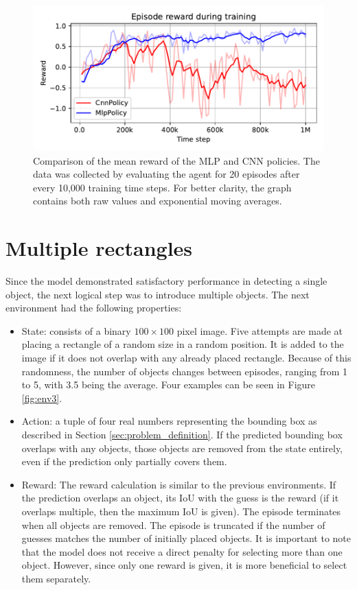 \documentclass[
  digital,     %
  oneside,     %
  nosansbold,  %
  nocolorbold, %
  lof,         %
  lot,         %
]{fithesis4}
\begin{document}
\begin{figure}
    \includegraphics[width=1\linewidth]{graphs/v2_mpl_cnn.pdf}
    \caption{Comparison of the mean reward of the MLP and CNN policies. The data was collected by evaluating the agent for 20 episodes after every 10,000 training time steps. For better clarity, the graph contains both raw values and exponential moving averages.}
    \label{fig:v2_mlp_cnn}
\end{figure}

\section{Multiple rectangles}
\label{sec:multi-rect}
Since the model demonstrated satisfactory performance in detecting a single object, the next logical step was to introduce multiple objects. The next environment had the following properties:
\begin{itemize}
    \item State: consists of a binary $100\times100$ pixel image. Five attempts are made at placing a rectangle of a random size in a random position. It is added to the image if it does not overlap with any already placed rectangle. Because of this randomness, the number of objects changes between episodes, ranging from 1 to 5, with 3.5 being the average. Four examples can be seen in Figure \ref{fig:env3}.
    \item Action: a tuple of four real numbers representing the bounding box as described in Section \ref{sec:problem_definition}. If the predicted bounding box overlaps with any objects, those objects are removed from the state entirely, even if the prediction only partially covers them.
    \item Reward: The reward calculation is similar to the previous environments. If the prediction overlaps an object, its IoU with the guess is the reward (if it overlaps multiple, then the maximum IoU is given). The episode terminates when all objects are removed. The episode is truncated if the number of guesses matches the number of initially placed objects. It is important to note that the model does not receive a direct penalty for selecting more than one object. However, since only one reward is given, it is more beneficial to select them separately.
\end{itemize}
\end{document}
